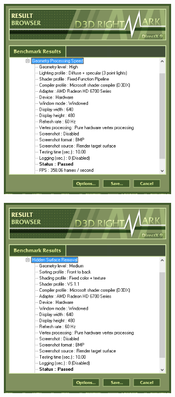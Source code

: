 \documentclass[
	a4paper,
	oneside,
	BCOR = 10mm,
	DIV = 12,
	12pt,
	headings = normal,
]{scrartcl}
\begin{document}
			\begin{figure}[!htbp]
				\centering
				\begin{subfigure}[t]{\columnwidth / 2}
					\centering
					\includegraphics[height=10\baselineskip]{./assets/y03s02-pcdiag-lab-04-p04-00-d3drightmark-res.png}
					\caption{}
					\label{subfig:d3drightmark-res}
				\end{subfigure}%
				\begin{subfigure}[t]{\columnwidth / 2}
					\centering
					\includegraphics[height=10\baselineskip]{./assets/y03s02-pcdiag-lab-04-p04-01-d3drightmark-hiddenpix-res.png}

\end{subfigure}
\end{figure}
\end{document}
